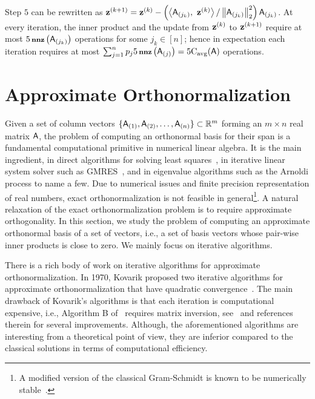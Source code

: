 %
Step $5$ can be rewritten as $\mathbf{z}^{(k+1)} = \mathbf{z}^{(k)} - \left(\left\langle {  {\ensuremath{\mathsf{A} }}_{(j_k)}},\ {\mathbf{z}^{(k)}} \right\rangle / \left\|{\mathsf{A} }_{(j_k)}\right\|_2^2\right) {\mathsf{A} }_{(j_k)}$. At every iteration, the inner product and the update from $\mathbf{z}^{(k)}$ to $\mathbf{z}^{(k+1)}$ require at most $5\operatorname{\textbf{\footnotesize nnz}}\left({\mathsf{A} }_{(j_k)}\right)$ operations for some $j_k\in{[n]}$; hence in expectation each iteration requires at most $\sum_{j=1}^{n}  p_j 5\operatorname{\textbf{\footnotesize nnz}}\left({\mathsf{A} }_{(j)}\right) = 5\mathrm{C}_{\mathrm{avg}}({\mathsf{A} })$ operations.
%



\section{Approximate Orthonormalization}
Given a set of column vectors $\{{\mathsf{A} }_{(1)},{\mathsf{A} }_{(2)},\ldots , {\mathsf{A} }_{(n)}\}\subset \mathbb{R}^m$ forming an $m\times n$ real matrix ${\mathsf{A} }$, the problem of computing an orthonormal basis for their span is a fundamental computational primitive in numerical linear algebra. It is the main ingredient, in direct algorithms for solving least squares~\cite{book:Bjork}, in iterative linear system solver such as GMRES~\cite{book:Saad}, and in eigenvalue algorithms such as the Arnoldi process to name a few. Due to numerical issues and finite precision representation of real numbers, exact orthonormalization is not feasible in general\footnote{A modified version of the classical Gram-Schmidt is known to be numerically stable~\cite{QR:numerics}.}. A natural relaxation of the exact orthonormalization problem is to require approximate orthogonality. In this section, we study the problem of computing an approximate orthonormal basis of a set of vectors, i.e., a set of basis vectors whose pair-wise inner products is close to zero. We mainly focus on iterative algorithms.
%

%
There is a rich body of work on iterative algorithms for approximate orthonormalization. In 1970, Kovarik proposed two iterative algorithms for approximate orthonormalization that have quadratic convergence~\cite{QR:Kovarik}. The main drawback of Kovarik's algorithms is that each iteration is computational expensive, i.e., Algorithm B of~\cite{QR:Kovarik} requires matrix inversion, see~\cite{QR:Popa} and references therein for several improvements. Although, the aforementioned algorithms are interesting from a theoretical point of view, they are inferior compared to the classical solutions in terms of computational efficiency.
%

